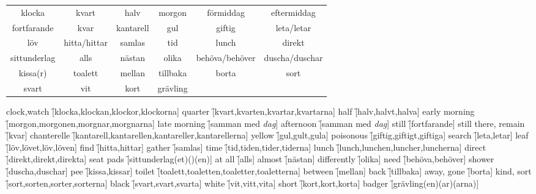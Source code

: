 \newpage
\begin{center}
    \begin{tabular}{|c c c c c c|}
        \hline
        klocka & kvart & halv & morgon & förmiddag & eftermiddag \\
        fortfarande & kvar & kantarell & gul & giftig & leta/letar \\
        löv & hitta/hittar & samlas & tid & lunch & direkt \\
        sittunderlag & alls & nästan & olika & behöva/behöver & duscha/duschar \\
        kissa(r) & toalett & mellan & tillbaka & borta & sort \\
        svart & vit & kort & grävling &  &  \\
        \hline
    \end{tabular}
\end{center}

\begin{questions}
    \begin{multicols}{2}
        \raggedcolumns
        \question clock,watch \f[klocka,klockan,klockor,klockorna]
        \question quarter \f[kvart,kvarten,kvartar,kvartarna]
        \question half \f[halv,halvt,halva]
        \question early morning \f[morgon,morgonen,morgnar,morgnarna]
        \question late morning \f[samman med \textit{dag}]
        \question afternoon \f[samman med \textit{dag}]
        \question still \f[fortfarande]
        \question still there, remain \f[kvar]
        \question chanterelle \f[kantarell,kantarellen,kantareller,kantarellerna]
        \question yellow \f[gul,gult,gula]
        \question poisonous \f[giftig,giftigt,giftiga]
        \question search \f[leta,letar]
        \question leaf \f[löv,lövet,löv,löven]
        \question find \f[hitta,hittar]
        \question gather \f[samlas]
        \question time \f[tid,tiden,tider,tiderna]
        \question lunch \f[lunch,lunchen,luncher,luncherna]
        \question direct \f[direkt,direkt,direkta]
        \question seat pads \f[sittunderlag(et)()(en)]
        \question at all \f[alls]
        \question almost \f[nästan]
        \question differently \f[olika]
        \question need \f[behöva,behöver]
        \question shower \f[duscha,duschar]
        \question pee \f[kissa,kissar]
        \question toilet \f[toalett,toaletten,toaletter,toaletterna]
        \question between \f[mellan]
        \question back \f[tillbaka]
        \question away, gone \f[borta]
        \question kind, sort \f[sort,sorten,sorter,sorterna]
        \question black \f[svart,svart,svarta]
        \question white \f[vit,vitt,vita]
        \question short \f[kort,kort,korta]
        \question badger \f[grävling(en)(ar)(arna)]
    \end{multicols}
\end{questions}
